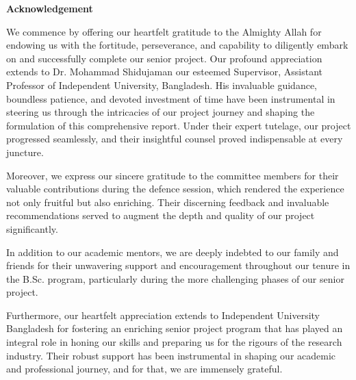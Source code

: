 \clearpage
\begin{center}
    \textbf{\LARGE Acknowledgement}
\end{center}
\vspace{1.5cm}
\par

We commence by offering our heartfelt gratitude to the Almighty Allah for endowing us with the fortitude, perseverance, and capability to diligently embark on and successfully complete our senior project. Our profound appreciation extends to Dr. Mohammad Shidujaman our esteemed Supervisor, Assistant Professor of Independent University, Bangladesh. His invaluable guidance, boundless patience, and devoted investment of time have been instrumental in steering us through the intricacies of our project journey and shaping the formulation of this comprehensive report. Under their expert tutelage, our project progressed seamlessly, and their insightful counsel proved indispensable at every juncture.
\vspace{0.5cm}

\par
Moreover, we express our sincere gratitude to the committee members for their valuable contributions during the defence session, which rendered the experience not only fruitful but also enriching. Their discerning feedback and invaluable recommendations served to augment the depth and quality of our project significantly.
\vspace{0.5cm}

\par
In addition to our academic mentors, we are deeply indebted to our family and friends for their unwavering support and encouragement throughout our tenure in the B.Sc. program, particularly during the more challenging phases of our senior project.
\vspace{0.5cm}

\par
Furthermore, our heartfelt appreciation extends to Independent University Bangladesh for fostering an enriching senior project program that has played an integral role in honing our skills and preparing us for the rigours of the research industry. Their robust support has been instrumental in shaping our academic and professional journey, and for that, we are immensely grateful.